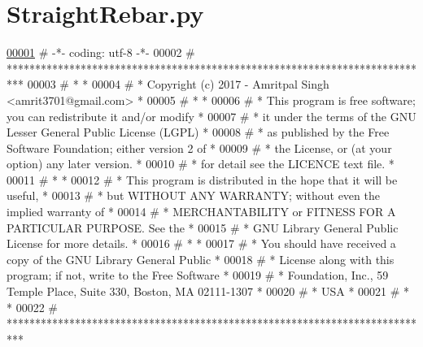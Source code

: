\hypertarget{StraightRebar_8py_source}{}\section{Straight\+Rebar.\+py}

\begin{DoxyCode}
\hypertarget{StraightRebar_8py_source.tex_l00001}{}\hyperlink{namespaceStraightRebar}{00001} \textcolor{comment}{# -*- coding: utf-8 -*-}
00002 \textcolor{comment}{# ***************************************************************************}
00003 \textcolor{comment}{# *                                                                         *}
00004 \textcolor{comment}{# *   Copyright (c) 2017 - Amritpal Singh <amrit3701@gmail.com>             *}
00005 \textcolor{comment}{# *                                                                         *}
00006 \textcolor{comment}{# *   This program is free software; you can redistribute it and/or modify  *}
00007 \textcolor{comment}{# *   it under the terms of the GNU Lesser General Public License (LGPL)    *}
00008 \textcolor{comment}{# *   as published by the Free Software Foundation; either version 2 of     *}
00009 \textcolor{comment}{# *   the License, or (at your option) any later version.                   *}
00010 \textcolor{comment}{# *   for detail see the LICENCE text file.                                 *}
00011 \textcolor{comment}{# *                                                                         *}
00012 \textcolor{comment}{# *   This program is distributed in the hope that it will be useful,       *}
00013 \textcolor{comment}{# *   but WITHOUT ANY WARRANTY; without even the implied warranty of        *}
00014 \textcolor{comment}{# *   MERCHANTABILITY or FITNESS FOR A PARTICULAR PURPOSE.  See the         *}
00015 \textcolor{comment}{# *   GNU Library General Public License for more details.                  *}
00016 \textcolor{comment}{# *                                                                         *}
00017 \textcolor{comment}{# *   You should have received a copy of the GNU Library General Public     *}
00018 \textcolor{comment}{# *   License along with this program; if not, write to the Free Software   *}
00019 \textcolor{comment}{# *   Foundation, Inc., 59 Temple Place, Suite 330, Boston, MA  02111-1307  *}
00020 \textcolor{comment}{# *   USA                                                                   *}
00021 \textcolor{comment}{# *                                                                         *}
00022 \textcolor{comment}{# ***************************************************************************}

\end{DoxyCode}
